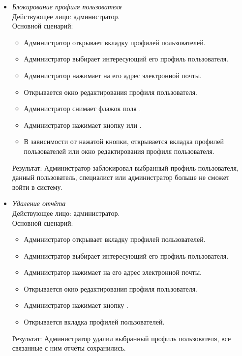 \begin{itemize}[topsep=0pt, parsep=0pt, itemsep=0pt, leftmargin=*, labelindent=0.5cm]
	\item \textit{Блокирование профиля пользователя} \\
	Действующее лицо: администратор. \\
	Основной сценарий:
	\begin{itemize}[topsep=0pt, parsep=0pt, itemsep=0pt, leftmargin=*, labelindent=0.5cm]
		\item Администратор открывает вкладку профилей пользователей.
		\item Администратор выбирает интересующий его профиль пользователя.
		\item Администратор нажимает на его адрес электронной почты.
		\item Открывается окно редактирования профиля пользователя.
		\item Администратор снимает флажок поля .
		\item Администратор нажимает кнопку  или .
		\item В зависимости от нажатой кнопки, открывается вкладка профилей пользователей или окно редактирования профиля пользователя.
	\end{itemize}
	Результат: Администратор заблокировал выбранный профиль пользователя, данный пользователь, специалист или администратор больше не сможет войти в систему.
\end{itemize}

\begin{itemize}[topsep=0pt, parsep=0pt, itemsep=0pt, leftmargin=*, labelindent=0.5cm]
	\item \textit{Удаление отчёта} \\
	Действующее лицо: администратор. \\
	Основной сценарий:
	\begin{itemize}[topsep=0pt, parsep=0pt, itemsep=0pt, leftmargin=*, labelindent=0.5cm]
		\item Администратор открывает вкладку профилей пользователей.
		\item Администратор выбирает интересующий его профиль пользователя.
		\item Администратор нажимает на его адрес электронной почты.
		\item Открывается окно редактирования профиля пользователя.
		\item Администратор нажимает кнопку .
		\item Открывается вкладка профилей пользователей.
	\end{itemize}
	Результат: Администратор удалил выбранный профиль пользователя, все связанные с ним отчёты сохранились.
\end{itemize}

